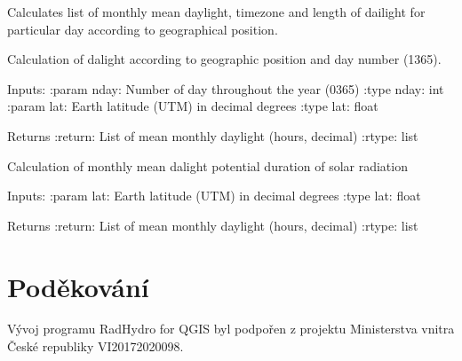\documentclass[letterpaper,10pt,english]{sphinxmanual}
\begin{document}
\begin{fulllineitems}
\label{\detokenize{libs:mdaylight.MonthlyDaylight}}
Calculates list of monthly mean daylight, timezone and length of
dailight for particular day according to geographical position.

\begin{fulllineitems}
\label{\detokenize{libs:mdaylight.MonthlyDaylight.dayLength}}
Calculation of dalight according to geographic position and day
number (1\sphinxhyphen{}365).

Inputs:
:param nday: Number of day throughout the year (0\sphinxhyphen{}365)
:type nday: int
:param lat: Earth latitude (UTM) in decimal degrees
:type lat: float

Returns
:return: List of mean monthly daylight (hours, decimal)
:rtype: list

\end{fulllineitems}


\begin{fulllineitems}
\label{\detokenize{libs:mdaylight.MonthlyDaylight.monthlyDaylights}}
Calculation of monthly mean dalight \sphinxhyphen{} potential duration of solar 
radiation

Inputs:
:param lat: Earth latitude (UTM) in decimal degrees
:type lat: float

Returns
:return: List of mean monthly daylight (hours, decimal)
:rtype: list

\end{fulllineitems}


\end{fulllineitems}



\section{Poděkování}
\label{\detokenize{ackn:podekovani}}\label{\detokenize{ackn::doc}}
Vývoj programu RadHydro for QGIS byl podpořen z projektu Ministerstva  vnitra
České republiky VI20172020098.
\end{document}
